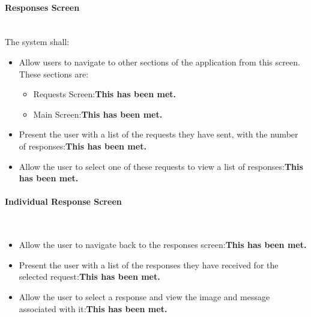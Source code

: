 \documentclass[a4paper]{article}
\newcommand{\subsubsubsection}[1]{\paragraph{#1}\mbox{}\\}
\begin{document}
\subsubsubsection{Responses Screen}
The system shall:
\begin{itemize}

\item Allow users to navigate to other sections of the application from this screen. These sections are:
\begin{itemize}
\item Requests Screen:\textbf{This has been met.} 
\item Main Screen:\textbf{This has been met.} 
\end{itemize}
\item Present the user with a list of the requests they have sent, with the number of responses:\textbf{This has been met.} 
\item Allow the user to select one of these requests to view a list of responses:\textbf{This has been met.} 
\end{itemize}
\subsubsubsection{Individual Response Screen}
\begin{itemize}
\item Allow the user to navigate back to the responses screen:\textbf{This has been met.} 
\item Present the user with a list of the responses they have received for the selected request:\textbf{This has been met.} 
\item Allow the user to select a response and view the image and message associated with it:\textbf{This has been met.} 






\end{itemize}
\end{document}
